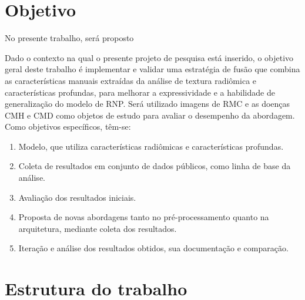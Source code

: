 \clearpage

\section{Objetivo}
\label{sec:cap1_objetivo}

No presente trabalho, será proposto 

Dado o contexto na qual o presente projeto de pesquisa está inserido, o objetivo geral deste trabalho é implementar e validar uma estratégia de fusão que combina as características manuais extraídas da análise de textura radiômica e características profundas, para melhorar a expressividade e a habilidade de generalização do modelo de \gls{RNP}. Será utilizado imagens de \gls{RMC} e as doenças \gls{CMH} e \gls{CMD} como objetos de estudo para avaliar o desempenho da abordagem. Como objetivos específicos, têm-se:

\begin{enumerate}

\item Modelo, que utiliza características radiômicas e
características profundas.

\item Coleta de resultados em conjunto de dados públicos, como linha de base da análise.

\item Avaliação dos resultados iniciais.

\item Proposta de novas abordagens tanto no pré-processamento quanto na arquitetura, mediante coleta dos resultados.

\item Iteração e análise dos resultados obtidos, sua documentação e comparação.
\end{enumerate}

\section{Estrutura do trabalho}
\label{sec:cap1_estrutura_trabalho}


